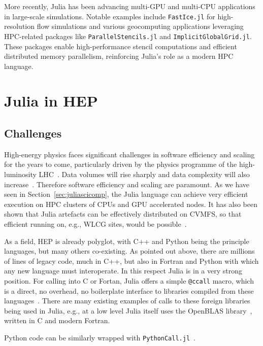 \documentclass{webofc}
\begin{document}
More recently, Julia has been advancing multi-GPU and multi-CPU applications in large-scale simulations. Notable examples include \texttt{FastIce.jl}\cite{fasticejl-github} for high-resolution flow simulations and various geocomputing applications leveraging HPC-related packages like \texttt{ParallelStencils.jl}\cite{parallelstenciljl-github} and \texttt{ImplicitGlobalGrid.jl}\cite{implicitglobalgridjl-github}. These packages enable high-performance stencil computations and efficient distributed memory parallelism, reinforcing Julia’s role as a modern HPC language.

\section{Julia in HEP}

\subsection{Challenges}

High-energy physics faces significant challenges in software efficiency and
scaling for the years to come, particularly driven by the physics programme of
the high-luminosity LHC~\cite{hsfcwp}. Data volumes will rise sharply and data
complexity will also
increase~\cite{CERN-LHCC-2022-005,Software:2815292,Valassi2021}. Therefore
software efficiency and scaling are paramount. As we have seen in
Section~\ref{sec:juliascicomp}, the Julia language can achieve very efficient
execution on HPC clusters of CPUs and GPU accelerated nodes. It has also been
shown that Julia artefacts can be effectively distributed on CVMFS, so that efficient
running on, e.g., WLCG sites, would be possible~\cite{elvis_cvmfs_caching}.

As a field, HEP is already polyglot, with C++ and Python being the principle
languages, but many others co-existing. As pointed out above, there are millions
of lines of legacy code, much in C++, but also in Fortran and Python with which
any new language must interoperate. In this respect Julia is in a very strong
position. For calling into C or Fortan, Julia offers a simple \texttt{@ccall}
macro, which is a direct, no overhead, no boilerplate interface to libraries
compiled from these languages~\cite{JuliaManualCCall}. There are many existing
examples of calls to these foreign libraries being used in Julia, e.g., at a low
level Julia itself uses the OpenBLAS library~\cite{6877458}, written in C and
modern Fortran. 

Python code can be similarly wrapped with
\texttt{PythonCall.jl}~\cite{PythonCall.jl}.
\end{document}
